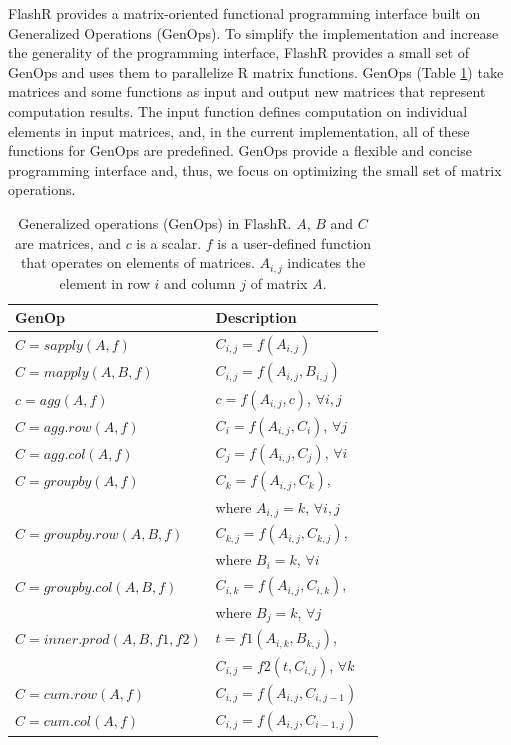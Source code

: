 FlashR provides a matrix-oriented functional programming interface built
on Generalized Operations (GenOps). To simplify the implementation and
increase the generality of the programming interface, FlashR provides
a small set of GenOps and uses them to parallelize R matrix functions.
GenOps (Table \ref{tbl:genops}) take matrices and
some functions as input and output new matrices that represent computation results.
The input function defines computation on individual elements in input matrices,
and, in the current implementation, all of these functions for GenOps are predefined.
GenOps provide a flexible and concise programming interface and, thus,
we focus on optimizing the small set of matrix operations.

\begin{table}
\begin{center}
\caption{Generalized operations (GenOps) in FlashR. $A$, $B$ and $C$ are
	matrices, and $c$ is a scalar. $f$ is a user-defined function that
	operates on elements of matrices. $A_{i,j}$ indicates the element
	in row $i$ and column $j$ of matrix $A$.}
\vspace{-10pt}
\footnotesize
\begin{tabular}{|l|l|l|}
\hline
GenOp & Description \\
\hline
$C=sapply(A, f)$ & $C_{i,j}=f(A_{i,j})$ \\
$C=mapply(A, B, f)$ & $C_{i,j}=f(A_{i,j}, B_{i,j})$ \\
\hline
$c=agg(A, f)$ & $c=f(A_{i,j}, c)$, $\forall i, j$ \\
$C=agg.row(A, f)$ & $C_i=f(A_{i,j}, C_i)$, $\forall j$ \\
$C=agg.col(A, f)$ & $C_j=f(A_{i,j}, C_j)$, $\forall i$ \\
\hline
$C=groupby(A, f)$ & $C_{k}=f(A_{i,j}, C_{k})$,\\ & where $A_{i, j}=k$, $\forall i,j$ \\
$C=groupby.row(A, B, f)$ & $C_{k,j}=f(A_{i,j}, C_{k,j})$,\\ & where $B_i=k$, $\forall i$ \\
$C=groupby.col(A, B, f)$ & $C_{i,k}=f(A_{i,j}, C_{i,k})$,\\ & where $B_j=k$, $\forall j$ \\
\hline
$C=inner.prod(A, B, f1, f2)$ & $t=f1(A_{i,k}, B_{k,j})$,
\\ & $C_{i,j}=f2(t, C_{i,j})$, $\forall k$ \\
\hline
$C=cum.row(A, f)$ & $C_{i,j}=f(A_{i,j}, C_{i,j-1})$ \\
$C=cum.col(A, f)$ & $C_{i,j}=f(A_{i,j}, C_{i-1,j})$ \\
\hline
\end{tabular}
\normalsize
\label{tbl:genops}
\vspace{-10pt}
\end{center}
\end{table}

